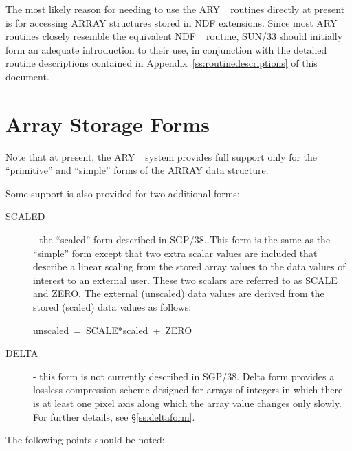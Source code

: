 \documentclass[twoside,11pt]{article}
\newcommand{\xref}[3]{#1}
\newcommand{\xlabel}[1]{}
\begin{document}
The most likely reason for needing to use the ARY\_ routines directly at
present is for accessing ARRAY structures stored in NDF extensions.
Since most ARY\_ routines closely resemble the equivalent NDF\_ routine,
\xref{SUN/33}{sun33}{} should initially form an adequate introduction to
their use, in conjunction with the detailed routine descriptions contained in
Appendix~\ref{ss:routinedescriptions} of this document.



\section{\xlabel{array_storage_forms}Array Storage Forms}
\label{array_storage_forms}

Note that at present, the ARY\_ system provides full support only for the
``primitive'' and ``simple'' forms of the ARRAY data structure.

Some support is also provided for two additional forms:

\begin{description}
\item[SCALED] - the ``scaled'' form described in SGP/38. This form is the
same as the ``simple'' form except that two
extra scalar values are included that describe a linear scaling from the
stored array values to the data values of interest to an external user.
These two scalars are referred to as SCALE and ZERO. The external
(unscaled) data values are derived from the stored (scaled) data values
as follows:

unscaled\ =\ SCALE*scaled\ +\ ZERO

\item[DELTA] - this form is not currently described in SGP/38. Delta form
provides a lossless compression scheme designed for arrays of integers in
which there is at least one pixel axis along which the array value changes
only slowly. For further details, see \S\ref{ss:deltaform}.

\end{description}

The following points should be noted:
\end{document}
